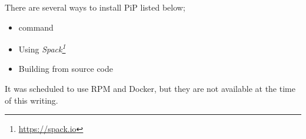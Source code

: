 
There are several ways to install PiP listed below;

\begin{itemize}
\item {} command
\item Using \em{Spack}\footnote{\url{https://spack.io}}
\item Building from source code
\end{itemize}

It was scheduled to use RPM and Docker, but 
they are not available at the time of this writing.
